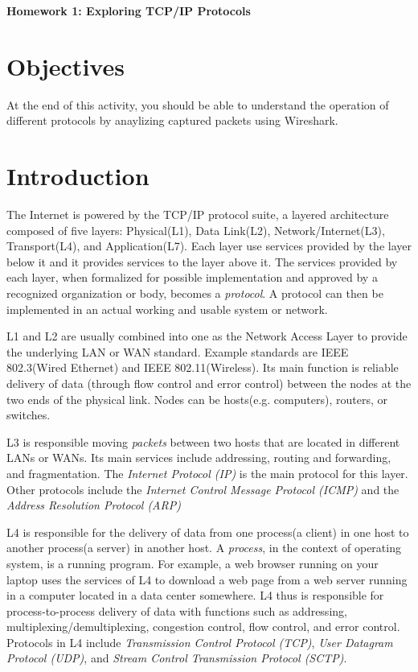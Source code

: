 \documentclass[a4paper, 11pt,oneside]{article}
\begin{document}
\begin{center}
   {\LARGE \textbf{Homework 1: Exploring TCP/IP Protocols }}
\end{center}

\section*{Objectives}
   At the end of this activity, you should be able to 
   understand the operation of different protocols by anaylizing captured packets using Wireshark.

\section{Introduction}
The Internet is powered by the TCP/IP protocol suite, a layered architecture composed of five layers: Physical(L1), Data Link(L2), Network/Internet(L3), Transport(L4), and Application(L7). Each layer use services provided by the layer below it and it provides services to the layer above it. The services provided by each layer, when formalized for possible implementation and approved by a recognized organization or body, becomes a \textit{protocol}. A protocol can then be implemented in an actual working and usable system or network.

L1 and L2 are usually combined into one as the Network Access Layer to provide the underlying LAN or WAN standard. Example standards are IEEE 802.3(Wired Ethernet) and IEEE 802.11(Wireless). Its main function is reliable delivery of data (through flow control and error control) between the nodes at the two ends of the physical link. Nodes can be hosts(e.g. computers), routers, or switches.

L3 is responsible moving \textit{packets} between two hosts that are located in different LANs or WANs. Its main services include addressing, routing and forwarding, and fragmentation. The \textit{Internet Protocol (IP)} is the main protocol for this layer. Other protocols include the \textit{Internet Control Message Protocol (ICMP)} and the \textit{Address Resolution Protocol (ARP)}

L4 is responsible for the delivery of data from one process(a client) in one host to another process(a server) in another host. A \textit{process}, in the context of operating system, is a running program. For example, a web browser running on your laptop uses the services of L4 to download a web page from a web server running in a computer located in a data center somewhere. L4 thus is responsible for process-to-process delivery of data with functions such as addressing, multiplexing/demultiplexing, congestion control, flow control, and error control. Protocols in L4 include \textit{Transmission Control Protocol (TCP)}, \textit{User Datagram Protocol (UDP)}, and \textit{Stream Control Transmission Protocol (SCTP)}.
\end{document}
